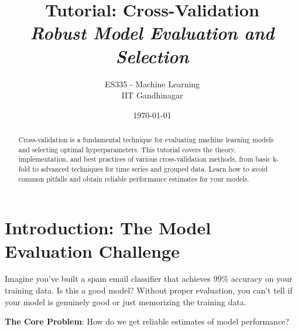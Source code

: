 \documentclass{article}
\title{\textbf{Tutorial: Cross-Validation} \\ \textit{Robust Model Evaluation and Selection}}
\author{ES335 - Machine Learning \\ IIT Gandhinagar}
\date{\today}
\begin{document}
\maketitle

\begin{abstract}
Cross-validation is a fundamental technique for evaluating machine learning models and selecting optimal hyperparameters. This tutorial covers the theory, implementation, and best practices of various cross-validation methods, from basic k-fold to advanced techniques for time series and grouped data. Learn how to avoid common pitfalls and obtain reliable performance estimates for your models.
\end{abstract}

\tableofcontents
\newpage

\section{Introduction: The Model Evaluation Challenge}

Imagine you've built a spam email classifier that achieves 99\% accuracy on your training data. Is this a good model? Without proper evaluation, you can't tell if your model is genuinely good or just memorizing the training data.

\textbf{The Core Problem}: How do we get reliable estimates of model performance?

\begin{center}
\end{center}
\end{document}
